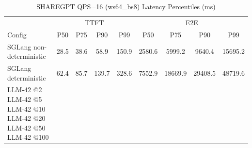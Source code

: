 \begin{table}[htbp]
\centering
\caption{SHAREGPT QPS=16 (ws64_bs8) Latency Percentiles (ms)}
\label{tab:sharegpt_qps16_ws64_bs8}
\begin{tabular}{l|cccc|cccc}
\toprule
& \multicolumn{4}{c|}{TTFT} & \multicolumn{4}{c}{E2E} \\
Config & P50 & P75 & P90 & P99 & P50 & P75 & P90 & P99 \\
\midrule
SGLang non-deterministic & 28.5 & 38.6 & 58.9 & 150.9 & 2580.6 & 5999.2 & 9640.4 & 15695.2 \\
SGLang deterministic & 62.4 & 85.7 & 139.7 & 328.6 & 7552.9 & 18669.9 & 29408.5 & 48719.6 \\
LLM-42 @2%
LLM-42 @5%
LLM-42 @10%
LLM-42 @20%
LLM-42 @50%
LLM-42 @100%
\bottomrule
\end{tabular}
\end{table}
